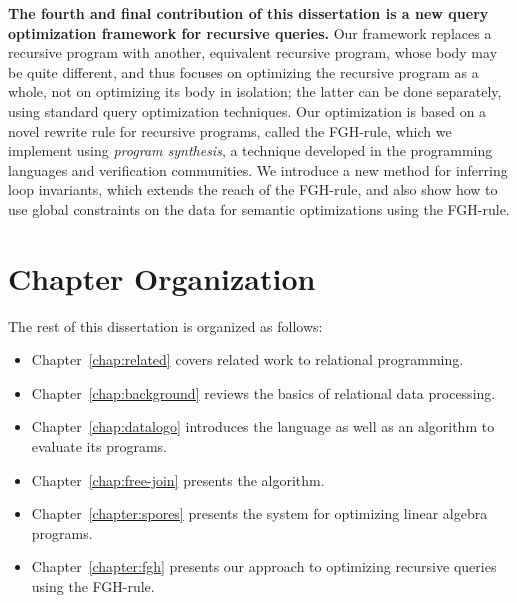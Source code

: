 \textbf{The fourth and final contribution of this dissertation is a new query optimization framework for
recursive queries.}
Our framework replaces a recursive program with
another, equivalent recursive program, whose body may be quite
different, and thus focuses on optimizing the recursive program as a
whole, not on optimizing its body in isolation; the latter can be done
separately, using standard query optimization techniques.  Our
optimization is based on a novel rewrite rule for recursive programs,
called the FGH-rule, which we implement using {\em program synthesis},
a technique developed in the programming languages and verification
communities. We introduce a new method for inferring loop invariants,
which extends the reach of the FGH-rule, and also show how to use
global constraints on the data for semantic optimizations using the
FGH-rule.  

\section{Chapter Organization}

The rest of this dissertation is organized as follows:
\begin{itemize}
  \item Chapter~\ref{chap:related} covers related work to relational programming.
  \item Chapter~\ref{chap:background} reviews the basics of relational data processing.
  \item Chapter~\ref{chap:datalogo} introduces the \datalogo language as well as an algorithm to evaluate its programs. 
  \item Chapter~\ref{chap:free-join} presents the \FJ algorithm.
  \item Chapter~\ref{chapter:spores} presents the \sys system for optimizing linear algebra programs.
  \item Chapter~\ref{chapter:fgh} presents our approach to optimizing recursive queries using the FGH-rule.
\end{itemize}